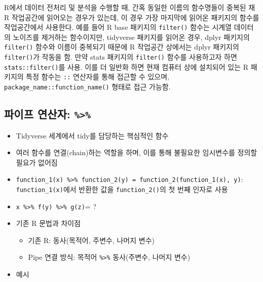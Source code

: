 \documentclass[
  11pt,
]{krantz}
\makeatletter
\providecommand{\tightlist}{%
  \setlength{\itemsep}{0pt}\setlength{\parskip}{0pt}}
\newenvironment{kframe}{%
\medskip{}
\setlength{\fboxsep}{.8em}
 \def\at@end@of@kframe{}%
 \ifinner\ifhmode%
  \def\at@end@of@kframe{\end{minipage}}%
  \begin{minipage}{\columnwidth}%
 \fi\fi%
 \def\FrameCommand##1{\hskip\@totalleftmargin \hskip-\fboxsep
 \colorbox{shadecolor}{##1}\hskip-\fboxsep
     \hskip-\linewidth \hskip-\@totalleftmargin \hskip\columnwidth}%
 \MakeFramed {\advance\hsize-\width
   \@totalleftmargin\z@ \linewidth\hsize
   \@setminipage}}%
 {\par\unskip\endMakeFramed%
 \at@end@of@kframe}
\newenvironment{rmdblock}[1]
  {
  \begin{itemize}
  \renewcommand{\labelitemi}{
    \raisebox{-.7\height}[0pt][0pt]{
      {\setkeys{Gin}{width=3em,keepaspectratio}\texttt{[image: images/\#1]}}
    }
  }
  \setlength{\fboxsep}{1em}
  \begin{kframe}
  \item
  }
  {
  \end{kframe}
  \end{itemize}
  }
\newenvironment{rmdtip}
  {\begin{rmdblock}{tip}}
  {\end{rmdblock}}
\makeatother
\begin{document}
\footnotesize

\begin{rmdtip}
\begin{rmdtip}

R에서 데이터 전처리 및 분석을 수행할 때, 간혹 동일한 이름의 함수명들이 중복된 채 R 작업공간에 읽어오는 경우가 있는데, 이 경우 가장 마지막에 읽어온 패키지의 함수를 작업공간에서 사용한다. 예를 들어 R base 패키지의 \texttt{filter()} 함수는 시계열 데이터의 노이즈를 제거하는 함수이지만, tidyverse 패키지를 읽어온 경우, dplyr 패키지의 \texttt{filter()} 함수와 이름이 중복되기 때문에 R 작업공간 상에서는 dplyr 패키지의 \texttt{filter()}가 작동을 함. 만약 stats 패키지의 \texttt{filter()} 함수를 사용하고자 하면 \texttt{stats::filter()}를 사용. 이를 더 일반화 하면 현재 컴퓨터 상에 설치되어 있는 R 패키지의 특정 함수는 \texttt{::} 연산자를 통해 접근할 수 있으며, \texttt{package\_name::function\_name()} 형태로 접근 가능함.

\end{rmdtip}
\end{rmdtip}

\normalsize

\hypertarget{pipe-op}{%
\subsection{\texorpdfstring{파이프 연산자: \texttt{\%\textgreater{}\%}}{파이프 연산자: \%\textgreater\%}}\label{pipe-op}}

\begin{itemize}
\item
  Tidyverse 세계에서 tidy를 담당하는 핵심적인 함수
\item
  여러 함수를 연결(chain)하는 역할을 하며, 이를 통해 불필요한 임시변수를 정의할 필요가 없어짐
\item
  \texttt{function\_1(x)\ \%\textgreater{}\%\ function\_2(y)\ =\ function\_2(function\_1(x),\ y)}: \texttt{function\_1(x)}에서 반환한 값을 \texttt{function\_2()}의 첫 번째 인자로 사용
\item
  \texttt{x\ \%\textgreater{}\%\ f(y)\ \%\textgreater{}\%\ g(z)}= ?
\item
  기존 R 문법과 차이점

  \begin{itemize}
  \tightlist
  \item
    기존 R: 동사(목적어, 주변수, 나머지 변수)
  \item
    Pipe 연결 방식: 목적어 \texttt{\%\textgreater{}\%} 동사(주변수, 나머지 변수)
  \end{itemize}
\item
  예시
\end{itemize}
\end{document}
